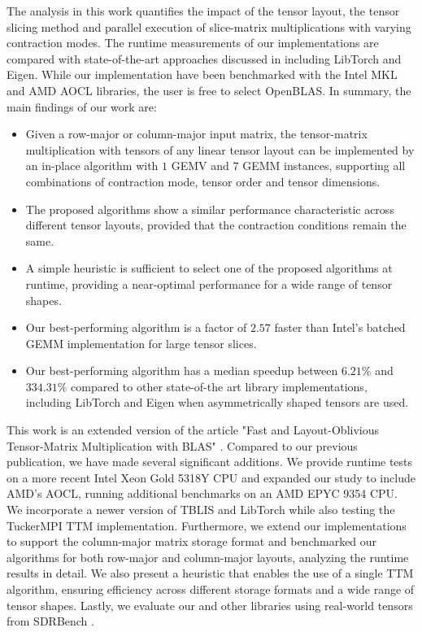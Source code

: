 The analysis in this work quantifies the impact of the tensor layout, the tensor slicing method and parallel execution of slice-matrix multiplications with varying contraction modes.
The runtime measurements of our implementations are compared with state-of-the-art approaches discussed in \citep{springer:2018:design, matthews:2018:high, paszke:2019:pytorch} including LibTorch and Eigen. 
While our implementation have been benchmarked with the Intel MKL and AMD AOCL libraries, the user is free to select OpenBLAS.
In summary, the main findings of our work are:
\begin{itemize}
	\item %
	Given a row-major or column-major input matrix, the tensor-matrix multiplication with tensors of any linear tensor layout can be implemented by an in-place algorithm with $1$ GEMV and $7$ GEMM instances, supporting all combinations of contraction mode, tensor order and tensor dimensions.
	\item %
	The proposed algorithms show a similar performance characteristic across different tensor layouts, provided that the contraction conditions remain the same.
	\item %
	A simple heuristic is sufficient to select one of the proposed algorithms at runtime, providing a near-optimal performance for a wide range of tensor shapes.	
	\item %
	Our best-performing algorithm is a factor of $2.57$ faster than Intel's batched GEMM implementation for large tensor slices.
	\item %
	Our best-performing algorithm has a median speedup between $6.21$\% and $334.31$\% compared to other state-of-the art library implementations, including LibTorch and Eigen when asymmetrically shaped tensors are used.
\end{itemize}


This work is an extended version of the article "Fast and Layout-Oblivious Tensor-Matrix Multiplication with BLAS" \cite{bassoy:2024:ttm}. 
Compared to our previous publication, we have made several significant additions. 
We provide runtime tests on a more recent Intel Xeon Gold 5318Y CPU and expanded our study to include AMD's AOCL, running additional benchmarks on an AMD EPYC 9354 CPU. 
We incorporate a newer version of TBLIS and LibTorch while also testing the TuckerMPI TTM implementation. 
Furthermore, we extend our implementations to support the column-major matrix storage format and benchmarked our algorithms for both row-major and column-major layouts, analyzing the runtime results in detail. 
We also present a heuristic that enables the use of a single TTM algorithm, ensuring efficiency across different storage formats and a wide range of tensor shapes.
Lastly, we evaluate our and other libraries using real-world tensors from SDRBench \cite{zhao:2020:sdrbench}.

